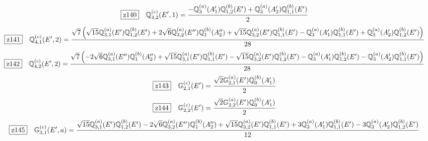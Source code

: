 \documentclass[fleqn,10pt,landscape]{jsarticle}
\begin{document}
\begin{dmath*}
\hspace*{3mm}\fbox{z140}\quad \mathbb{Q}_{4,2}^{(c)}(E^{\prime},1)=\frac{- \mathbb{Q}_{3}^{(a)}(A_{1}^{\prime}) \mathbb{Q}_{1,2}^{(b)}(E^{\prime}) + \mathbb{Q}_{3}^{(a)}(A_{2}^{\prime}) \mathbb{Q}_{1,1}^{(b)}(E^{\prime})}{2}
\end{dmath*}
\begin{dmath*}
\hspace*{3mm}\fbox{z141}\quad \mathbb{Q}_{4,1}^{(c)}(E^{\prime},2)=\frac{\sqrt{7} \left(\sqrt{15} \mathbb{Q}_{3,1}^{(a)}(E^{\prime}) \mathbb{Q}_{1,2}^{(b)}(E^{\prime}) + 2 \sqrt{6} \mathbb{Q}_{3,2}^{(a)}(E^{\prime\prime}) \mathbb{Q}_{1}^{(b)}(A_{2}^{\prime\prime}) + \sqrt{15} \mathbb{Q}_{3,2}^{(a)}(E^{\prime}) \mathbb{Q}_{1,1}^{(b)}(E^{\prime}) - \mathbb{Q}_{3}^{(a)}(A_{1}^{\prime}) \mathbb{Q}_{1,1}^{(b)}(E^{\prime}) + \mathbb{Q}_{3}^{(a)}(A_{2}^{\prime}) \mathbb{Q}_{1,2}^{(b)}(E^{\prime})\right)}{28}
\end{dmath*}
\begin{dmath*}
\hspace*{3mm}\fbox{z142}\quad \mathbb{Q}_{4,2}^{(c)}(E^{\prime},2)=\frac{\sqrt{7} \left(- 2 \sqrt{6} \mathbb{Q}_{3,1}^{(a)}(E^{\prime\prime}) \mathbb{Q}_{1}^{(b)}(A_{2}^{\prime\prime}) + \sqrt{15} \mathbb{Q}_{3,1}^{(a)}(E^{\prime}) \mathbb{Q}_{1,1}^{(b)}(E^{\prime}) - \sqrt{15} \mathbb{Q}_{3,2}^{(a)}(E^{\prime}) \mathbb{Q}_{1,2}^{(b)}(E^{\prime}) - \mathbb{Q}_{3}^{(a)}(A_{1}^{\prime}) \mathbb{Q}_{1,2}^{(b)}(E^{\prime}) - \mathbb{Q}_{3}^{(a)}(A_{2}^{\prime}) \mathbb{Q}_{1,1}^{(b)}(E^{\prime})\right)}{28}
\end{dmath*}
\begin{dmath*}
\hspace*{3mm}\fbox{z143}\quad \mathbb{G}_{2,1}^{(c)}(E^{\prime})=\frac{\sqrt{2} \mathbb{G}_{2,1}^{(a)}(E^{\prime}) \mathbb{Q}_{0}^{(b)}(A_{1}^{\prime})}{2}
\end{dmath*}
\begin{dmath*}
\hspace*{3mm}\fbox{z144}\quad \mathbb{G}_{2,2}^{(c)}(E^{\prime})=\frac{\sqrt{2} \mathbb{G}_{2,2}^{(a)}(E^{\prime}) \mathbb{Q}_{0}^{(b)}(A_{1}^{\prime})}{2}
\end{dmath*}
\begin{dmath*}
\hspace*{3mm}\fbox{z145}\quad \mathbb{G}_{3,1}^{(c)}(E^{\prime},a)=\frac{\sqrt{15} \mathbb{Q}_{3,1}^{(a)}(E^{\prime}) \mathbb{Q}_{1,2}^{(b)}(E^{\prime}) - 2 \sqrt{6} \mathbb{Q}_{3,2}^{(a)}(E^{\prime\prime}) \mathbb{Q}_{1}^{(b)}(A_{2}^{\prime\prime}) + \sqrt{15} \mathbb{Q}_{3,2}^{(a)}(E^{\prime}) \mathbb{Q}_{1,1}^{(b)}(E^{\prime}) + 3 \mathbb{Q}_{3}^{(a)}(A_{1}^{\prime}) \mathbb{Q}_{1,1}^{(b)}(E^{\prime}) - 3 \mathbb{Q}_{3}^{(a)}(A_{2}^{\prime}) \mathbb{Q}_{1,2}^{(b)}(E^{\prime})}{12}
\end{dmath*}
\end{document}
